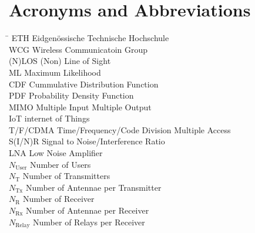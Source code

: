 \section*{Acronyms and Abbreviations}
\begin{tabbing}
 \hspace*{3cm}  \= \kill
 ETH \> Eidgenössische Technische Hochschule \\[0.5ex]
 WCG \> Wireless Communicatoin Group \\[0.5ex]
 (N)LOS  \> (Non) Line of Sight \\[0.5ex]
 ML  \> Maximum Likelihood\\[0.5ex]
 CDF  \> Cummulative Distribution Function\\[0.5ex]
 PDF \> Probability Density Function\\[0.5ex]
 MIMO \> Multiple Input Multiple Output\\[0.5ex]
 IoT \> internet of Things\\[0.5ex]
 T/F/CDMA \> Time/Frequency/Code Division Multiple Access \\[0.5ex]
 S(I/N)R \> Signal to Noise/Interference Ratio \\[0.5ex]
 LNA \> Low Noise Amplifier \\[0.5ex]
 $N_\text{User}$ \> Number of Users\\[0.5ex]
 $N_\text{T}$ \> Number of Transmitters\\[0.5ex]
 $N_\text{Tx}$ \> Number of Antennae per Transmitter\\[0.5ex]
 $N_\text{R}$ \> Number of Receiver\\[0.5ex]
 $N_\text{Rx}$ \> Number of Antennae per Receiver\\[0.5ex]
 $N_\text{Relay}$ \> Number of Relays per Receiver\\[0.5ex]
\end{tabbing}

